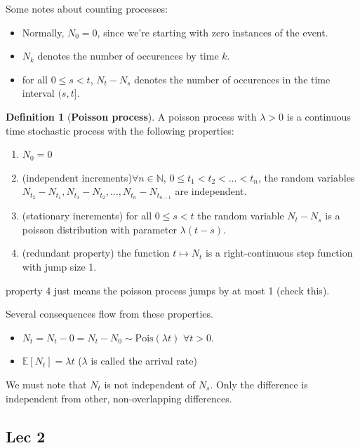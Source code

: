 \documentclass[12pt]{article}
\theoremstyle{definition}
\newtheorem{definition}{Definition}[section]
\begin{document}
Some notes about counting processes:
\begin{itemize}
  \item Normally, $N_0 = 0$, since we're starting with zero instances of the event.
  \item $N_k$ denotes the number of occurences by time $k$.
  \item for all $ 0 \leq s < t$, $N_t - N_s$ denotes the number of occurences in the time interval $(s, t]$.
\end{itemize}

\begin{definition}[\textbf{Poisson process}]
  A poisson process with $\lambda > 0$ is a continuous time stochastic process with the following properties:
  \begin{enumerate}
    \item $N_0 = 0$
    \item (independent increments)$\forall n \in \mathbb{N}$, $0 \leq t_1 < t_2 < \dots < t_n$, the random variables $N_{t_2} - N_{t_1}, N_{t_3} - N_{t_2}, \dots, N_{t_n} - N_{t_{n-1}}$ are independent.
    \item (stationary increments) for all $0 \leq s < t$ the random variable $N_t - N_s$ is a poisson distribution with parameter $\lambda(t-s)$.
    \item (redundant property) the function $t \mapsto N_t$ is a right-continuous step function with jump size 1.
    \end{enumerate}
\end{definition}

property 4 just means the poisson process jumps by at most 1 (check this).

Several consequences flow from these properties.

\begin{itemize}
  \item $N_t = N_t - 0 = N_t - N_0 \sim \text{Pois}(\lambda t)$ $\forall t > 0$.
  \item $\mathbb{E}[N_t] = \lambda t$ ($\lambda$ is called the arrival rate)
\end{itemize}

We must note that $N_t$ is not independent of $N_s$. Only the difference is independent from other, non-overlapping differences.

\subsection{Lec 2}
\end{document}
